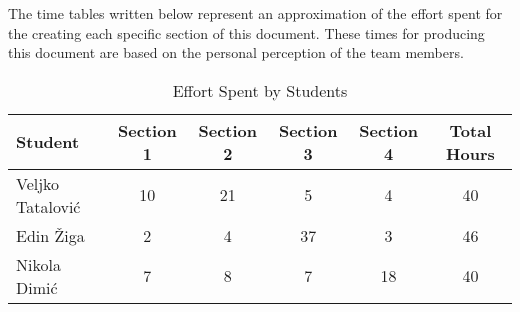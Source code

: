 The time tables written below represent an approximation of the effort spent for the
creating each specific section of this document. These times for producing this document are based on the personal perception of the team members.

\begin{table}[h!]
\centering
\begin{tabular}{|l|c|c|c|c|c|}
\hline
\textbf{Student} & \textbf{Section 1} & \textbf{Section 2} & \textbf{Section 3} & \textbf{Section 4} & \textbf{Total Hours} \\ \hline
Veljko Tatalović & 10 & 21 & 5 & 4 & 40 \\ \hline
Edin Žiga & 2 & 4 & 37 & 3 & 46\\ \hline
Nikola Dimić & 7 & 8 & 7 & 18 & 40 \\ \hline
\end{tabular}
\caption{Effort Spent by Students}
\label{tab:effort_table}
\end{table}